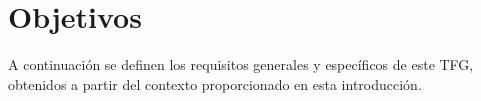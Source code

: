 %
%

\section{Objetivos}
\label{sec:objetivos}

A continuación se definen los requisitos generales y específicos de este TFG, obtenidos a partir del contexto proporcionado en esta introducción.

